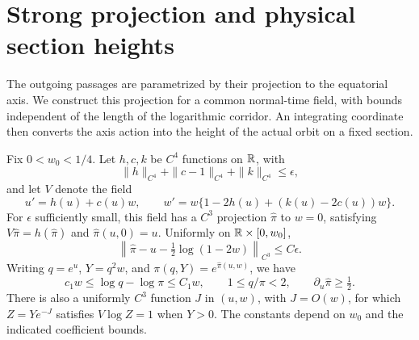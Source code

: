 \section{Strong projection and physical section heights}
\label{sec:strong-projection}
\label{subsec:normal-time-projection}

The outgoing passages are parametrized by their projection to the
equatorial axis. We construct this projection for a common normal-time
field, with bounds independent of the length of the logarithmic corridor.
An integrating coordinate then converts the axis action into the height
of the actual orbit on a fixed section.

\begin{lemma}\label{lem:normal-time-projection}
Fix \(0<w_0<1/4\).  Let \(h,c,k\) be \(C^4\) functions on
\(\mathbb R\), with
\[
 \|h\|_{C^4}+\|c-1\|_{C^4}+\|k\|_{C^4}\le\epsilon,
\]
and let \(V\) denote the field
\begin{equation}\label{eq:normal-time-field}
 u'=h(u)+c(u)w,\qquad
 w'=w\{1-2h(u)+(k(u)-2c(u))w\}.
\end{equation}
For \(\epsilon\) sufficiently small, this field has a \(C^3\)
projection \(\widehat\pi\) to \(w=0\), satisfying
\(V\widehat\pi=h(\widehat\pi)\) and
\(\widehat\pi(u,0)=u\).  Uniformly on \(\mathbb R\times[0,w_0]\),
\[
 \left\|\widehat\pi-u-\tfrac12\log(1-2w)\right\|_{C^3}
 \le C\epsilon.
\]
Writing \(q=e^u\), \(Y=q^2w\), and
\(\pi(q,Y)=e^{\widehat\pi(u,w)}\), we have
\begin{equation}\label{eq:normal-time-footpoint-bounds}
 c_1w\le\log q-\log\pi\le C_1w,\qquad
 1\le q/\pi<2,\qquad \partial_u\widehat\pi\ge\tfrac12.
\end{equation}
There is also a uniformly \(C^3\) function \(J\) in \((u,w)\),
with \(J=O(w)\), for which \(Z=Ye^{-J}\) satisfies
\(V\log Z=1\) when \(Y>0\).  The constants depend on \(w_0\)
and the indicated coefficient bounds.
\end{lemma}

